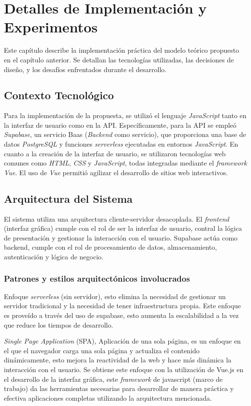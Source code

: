 \chapter{Detalles de Implementación y Experimentos}\label{chapter:implementation}
Este capítulo describe la implementación práctica del modelo teórico propuesto en el capítulo anterior. Se detallan las tecnologías utilizadas, las decisiones de diseño, y los desafíos enfrentados durante el desarrollo.


\section{Contexto Tecnol\'ogico}
Para la implementación de la propuesta, se utilizó el lenguaje \textit{JavaScript} tanto en la interfaz de usuario como en la API. Específicamente, para la API se empleó \textit{Supabase}, un servicio Baas (\textit{Backend} como servicio), que proporciona una base de datos \textit{PostgreSQL} y funciones \textit{serverless} ejecutadas en entornos \textit{JavaScript}. En cuanto a la creación de la interfaz de usuario, se utilizaron tecnologías web comunes como \textit{HTML}, \textit{CSS} y \textit{JavaScript}, todas integradas mediante el \textit{framework} \textit{Vue}. El uso de \textit{Vue} permitió agilizar el desarrollo de sitios web interactivos. 

\section{Arquitectura del Sistema}
El sistema utiliza una arquitectura cliente-servidor desacoplada. El \textit{frontend} (interfaz gr\'afica) cumple con el rol de ser la interfaz de usuario, contral la l\'ogica de presentaci\'on y gestionar la interacci\'on con el usuario. Supabase act\'ua como backend, cumple con el rol de procesamiento de datos, almacenamiento, autenticaci\'on y l\'ogica de negocio.

\subsection{Patrones y estilos arquitect\'onicos involucrados}
Enfoque \textit{serverless} (sin servidor), esto elimina la necesidad de gestionar un servidor tradicional y la necesidad de tener infraestructura propia. Este enfoque es prove\'ido a trav\'es del uso de supabase, esto aumenta la escalabilidad a la vez que reduce los tiempos de desarrollo.

\textit{Single Page Application} (SPA), Aplicaci\'on de una sola p\'agina, es un enfoque en el que el navegador carga una sola p\'agina y actualiza el contenido din\'amicamente, esto mejora la reactividad de la web y hace m\'as din\'amica la interacci\'on con el usuario. Se obtiene este enfoque con la utilizaci\'on de Vue.js en el desarrollo de la interfaz gr\'afica, este \textit{framework} de javascript (marco de trabajo) da las herramientas necesarias para desarrollar de manera pr\'actica y efectiva aplicaciones completas utilizando la arquitectura mencionada.


